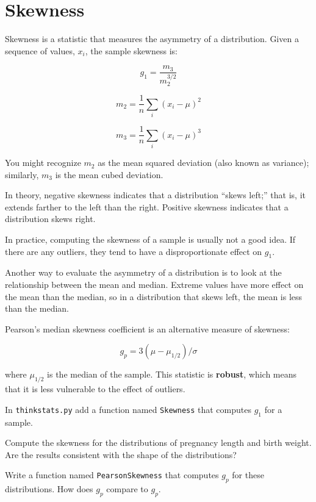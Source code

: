 \documentclass[10pt]{book}
\begin{document}
\section{Skewness}

Skewness is a statistic that measures the asymmetry of a
distribution.  Given a sequence of values, $x_i$, the sample skewness
is:

\[ g_1 = \frac{m_3}{m_2^{3/2}}\]

\[ m_2 = \frac{1}{n} \sum_i (x_i - \mu)^2 \]

\[ m_3 = \frac{1}{n} \sum_i (x_i - \mu)^3 \]

You might recognize $m_2$ as the mean squared deviation (also known as
variance); similarly, $m_3$ is the mean cubed deviation.

In theory, negative skewness indicates that a distribution 
``skews left;'' that is, it extends
farther to the left than the right.  Positive skewness indicates
that a distribution skews right.

In practice, computing the skewness of a sample is usually not
a good idea.  If there are any outliers, they tend to
have a disproportionate effect on $g_1$.

Another way to evaluate the asymmetry of a distribution is to look
at the relationship between the mean and median.
Extreme values have more effect on the mean than the median, so
in a distribution that skews left, the mean is less than the median.

Pearson's median skewness coefficient is an alternative measure
of skewness:

\[ g_p = 3 (\mu − \mu_{1/2}) / \sigma \]

where $\mu_{1/2}$ is the median of the sample.  This statistic is {\bf
  robust}, which means that it is less vulnerable to the effect of
outliers.

\begin{ex}

In {\tt thinkstats.py} add a function named {\tt Skewness} that computes
$g_1$ for a sample.

Compute the skewness for the distributions of pregnancy length and
birth weight.  Are the results consistent with the shape of the
distributions?

Write a function named {\tt PearsonSkewness} that computes $g_p$
for these distributions.  How does $g_p$ compare to $g_p$.

\end{ex}
\end{document}
